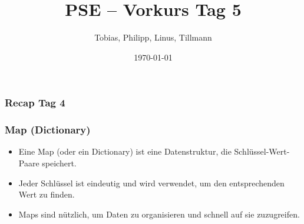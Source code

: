 \documentclass{../../presentation}
\title{PSE – Vorkurs Tag 5}
\author{Tobias, Philipp, Linus, Tillmann}
\institute{FIUS - Fachgruppe Informatik Universität Stuttgart}
\date{\today}
\begin{document}
\begin{frame}
	\titlepage
\end{frame}

\begin{frame}
	\listoftodos
\end{frame}

\begin{frame}
	\frametitle{Recap Tag 4}
\end{frame}

\begin{frame}[fragile]
\frametitle{Map (Dictionary)}
\begin{itemize}
	\item Eine Map (oder ein Dictionary) ist eine Datenstruktur, die Schlüssel-Wert-Paare speichert.
	\item Jeder Schlüssel ist eindeutig und wird verwendet, um den entsprechenden Wert zu finden.
	\item Maps sind nützlich, um Daten zu organisieren und schnell auf sie zuzugreifen.
\end{itemize}
\end{frame}
\end{document}
